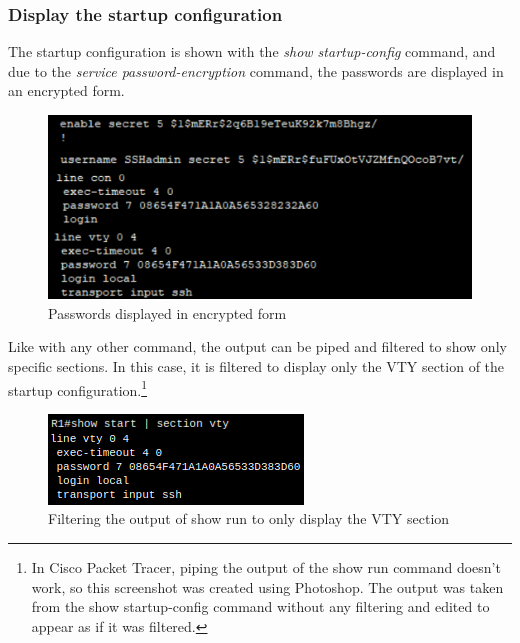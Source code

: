 \documentclass[a4paper]{article}
\newcommand{\abc}{\hfill \break}
\newcommand{\ii}{\textit}
\begin{document}
\subsubsection{Display the startup configuration}
The startup configuration is shown with the \ii{show startup-config} command, and due to the \ii{service password-encryption} command, the passwords are displayed in an encrypted form.
\begin{figure}[h]
	\includegraphics[scale=0.20]{images/passwords.png}
	\centering
	\caption{Passwords displayed in encrypted form}
\end{figure}\abc
Like with any other command, the output can be piped and filtered to show only specific sections. In this case, it is filtered to display only the VTY section of the startup configuration.\footnote{In Cisco Packet Tracer, piping the output of the show run command doesn't work, so this screenshot was created using Photoshop. The output was taken from the show startup-config command without any filtering and edited to appear as if it was filtered.}
\begin{figure}[h]
	\includegraphics[scale=0.60]{images/clueless.png}
	\centering
	\caption{Filtering the output of show run to only display the VTY section}
\end{figure}\abc
\newpage
\end{document}

